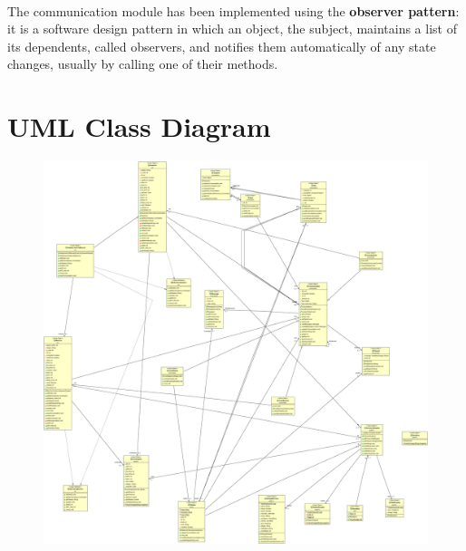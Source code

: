 \documentclass[a4paper,titlepage]{article}
\begin{document}
~

The communication module has been implemented using the \textbf{observer pattern}: it is a software design pattern in which an object, the subject,
maintains a list of its dependents, called observers, and notifies them automatically of any state
changes, usually by calling one of their methods.

\newpage
\part{UML Class Diagram}


\begin{figure}
\centering
\includegraphics[scale=0.2]{classDiagram.png}
\end{figure}
\end{document}
